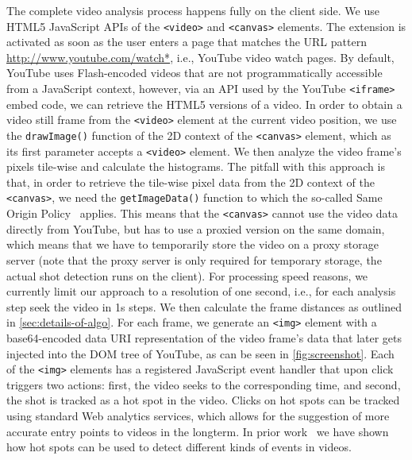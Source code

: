 \documentclass{acm_proc_article-sp}
\newcommand{\inlinelistingsize}{\fontsize{8pt}{11pt}}
\let\oldurl\url
\renewcommand{\url}[1]{\inlinelistingsize\oldurl{#1}}
\begin{document}
The complete video analysis process happens fully on the client side. We use HTML5 JavaScript APIs of the \texttt{<video>} and \texttt{<canvas>} elements. The extension is activated as soon as the user enters a page that matches the URL pattern \url{http://www.youtube.com/watch*}, i.e., YouTube video watch pages. By default, YouTube uses Flash-encoded videos that are not programmatically accessible from a JavaScript context, however, via an API used by the YouTube \texttt{<iframe>} embed code, we can retrieve the HTML5 versions of a video. In order to obtain a video still frame from the \texttt{<video>} element at the current video position, we use the \texttt{drawImage()} function of the 2D context of the \texttt{<canvas>} element, which as its first parameter accepts a \texttt{<video>} element. We then analyze the video frame's pixels tile-wise and calculate the histograms. The pitfall with this approach is that, in order to retrieve the tile-wise pixel data from the 2D context of the \texttt{<canvas>}, we need the \texttt{getImageData()} function to which the so-called Same Origin Policy~\cite{sameoriginpolicy} applies. This means that the \texttt{<canvas>} cannot use the video data directly  from YouTube, but has to use a proxied version on the same domain, which means that we have to temporarily store the video on a proxy storage server (note that the proxy server is only required for temporary storage, the actual shot detection runs on the client). For processing speed reasons, we currently limit our approach to a resolution of one second, i.e., for each analysis step seek the video in 1s steps. We then calculate the frame distances as outlined in \autoref{sec:details-of-algo}. For each frame, we generate an \texttt{<img>} element with a base64-encoded data URI representation of the video frame's data that later gets injected into the DOM tree of YouTube, as can be seen in \autoref{fig:screenshot}. Each of the \texttt{<img>} elements has a registered JavaScript event handler that upon click triggers two actions: first, the video seeks to the corresponding time, and second, the shot is tracked as a hot spot in the video. Clicks on hot spots can be tracked using standard Web analytics services, which allows for the suggestion of more accurate entry points to videos in the longterm. 
In prior work~\cite{derive2011} we have shown how hot spots can be used to detect different kinds of events in videos.

\end{document}
